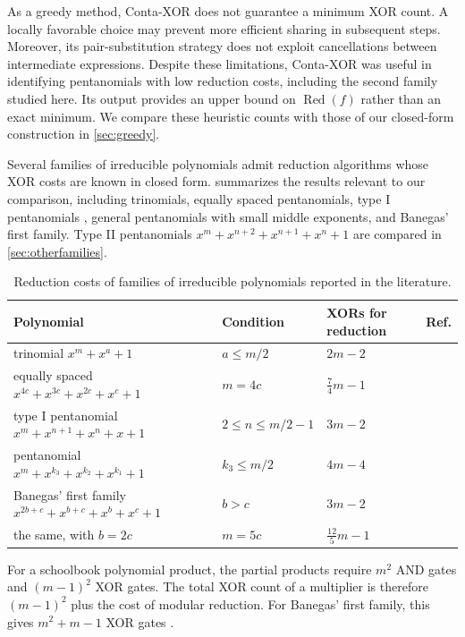 \documentclass{ieeeaccess}
\theoremstyle{plain}
\theoremstyle{definition}
\newcommand{\Red}{\operatorname{Red}}
\begin{document}
As a greedy method, Conta-XOR does not guarantee a minimum XOR count. A locally
favorable choice may prevent more efficient sharing in subsequent steps.
Moreover, its pair-substitution strategy does not exploit cancellations between
intermediate expressions. Despite these limitations, Conta-XOR was useful in
identifying pentanomials with low reduction costs, including the second family
studied here. Its output provides an upper bound on $\Red(f)$ rather than an
exact minimum. We compare these heuristic counts with those of our closed-form
construction in \cref{sec:greedy}.

Several families of irreducible polynomials admit reduction algorithms whose XOR
costs are known in closed form.  summarizes the results relevant
to our comparison, including trinomials, equally spaced pentanomials, type I
pentanomials \cite{RodriguezKoc2003,ReyhaniHasan2004,Imana2018}, general
pentanomials with small middle exponents, and Banegas' first family. Type II
pentanomials $x^m+x^{n+2}+x^{n+1}+x^n+1$ \cite{RodriguezKoc2003} are compared in
\cref{sec:otherfamilies}.

\begin{table}[t]
\centering\small
\caption{Reduction costs of families of irreducible
polynomials reported in the literature.}
\label{tab:known}
\begin{tabular}{@{}l l l l@{}}
\toprule
Polynomial & Condition & XORs for reduction & Ref.\\
\midrule
trinomial $x^m+x^a+1$
  & $a\le m/2$
  & $2m-2$
  & \cite{SunarKoc1999,Wu2002}\\
equally spaced
  $x^{4c}+x^{3c}+x^{2c}+x^c+1$
  & $m=4c$
  & $\tfrac74m-1$
  & \cite{HasanWangBhargava1992,Banegas2015}\\
type I pentanomial $x^m+x^{n+1}+x^n+x+1$
  & $2\le n\le m/2-1$
  & $3m-2$
  & \cite{ReyhaniHasan2004,BCP2019}\\
pentanomial $x^m+x^{k_3}+x^{k_2}+x^{k_1}+1$
  & $k_3\le m/2$
  & $4m-4$
  & \cite{ReyhaniHasan2004}\\
Banegas' first family
  $x^{2b+c}+x^{b+c}+x^b+x^c+1$
  & $b>c$
  & $3m-2$
  & \cite{BCP2019}\\
\quad the same, with $b=2c$
  & $m=5c$
  & $\tfrac{12}{5}m-1$
  & \cite{BCP2019}\\
\bottomrule
\end{tabular}
\end{table}

For a schoolbook polynomial product, the partial products require $m^2$ AND
gates and $(m-1)^2$ XOR gates. The total XOR count of a multiplier is therefore
$(m-1)^2$ plus the cost of modular reduction. For Banegas' first family, this
gives $m^2+m-1$ XOR gates \cite{BCP2019}.
\end{document}
